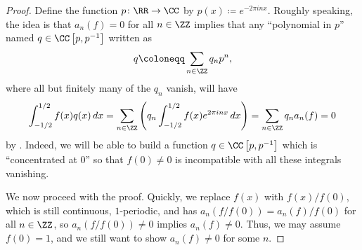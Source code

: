 \documentclass[notes.tex]{subfiles}
\begin{document}
\begin{proof}
	Define the function $p\colon\RR\to\CC$ by $p(x)\coloneqq e^{-2\pi inx}$. Roughly speaking, the idea is that $a_n(f)=0$ for all $n\in\ZZ$ implies that any ``polynomial in $p$'' named $q\in\CC\left[p,p^{-1}\right]$ written as
	\[q\coloneqq\sum_{n\in\ZZ}q_np^n,\]
	where all but finitely many of the $q_n$ vanish, will have
	\[\int_{-1/2}^{1/2}f(x)q(x)\,dx=\sum_{n\in\ZZ}\left(q_n\int_{-1/2}^{1/2}f(x)e^{2\pi inx}\,dx\right)=\sum_{n\in\ZZ}q_na_n(f)=0\]
	by . Indeed, we will be able to build a function $q\in\CC\left[p,p^{-1}\right]$ which is ``concentrated at $0$'' so that $f(0)\ne0$ is incompatible with all these integrals vanishing.

	We now proceed with the proof. Quickly, we replace $f(x)$ with $f(x)/f(0)$, which is still continuous, $1$-periodic, and has $a_n(f/f(0))=a_n(f)/f(0)$ for all $n\in\ZZ$, so $a_n(f/f(0))\ne0$ implies $a_n(f)\ne0$. Thus, we may assume $f(0)=1$, and we still want to show $a_n(f)\ne0$ for some $n$.


\end{proof}
\end{document}
